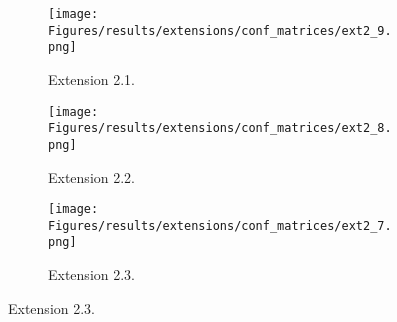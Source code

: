 \begin{figure}[!htb]
    \begin{adjustbox}{center}
        \begin{subfigure}{.43\textwidth}
            \centering
            \texttt{[image: Figures/results/extensions/conf\_matrices/ext2\_9.png]}
            \caption{Extension 2.1.}
        \end{subfigure}
        \begin{subfigure}{.355\textwidth}
            \centering
            \texttt{[image: Figures/results/extensions/conf\_matrices/ext2\_8.png]}
            \caption{Extension 2.2.}
        \end{subfigure}
        \begin{subfigure}{.355\textwidth}
            \centering
            \texttt{[image: Figures/results/extensions/conf\_matrices/ext2\_7.png]}
            \caption{Extension 2.3.}
        \end{subfigure}
    \end{adjustbox}
\end{figure}

\clearpage

